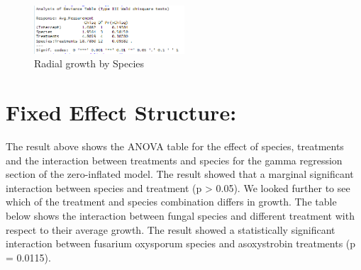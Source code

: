 \documentclass[
  10pt,
  letterpaper,
  twocolumn]{article}
\begin{document}
\begin{figure}

{\centering \includegraphics[width=0.5\textwidth,height=\textheight]{Fig11.png}

}

\caption{Radial growth by Species}

\end{figure}

\hypertarget{fixed-effect-structure}{%
\section{Fixed Effect Structure:}\label{fixed-effect-structure}}

The result above shows the ANOVA table for the effect of species,
treatments and the interaction between treatments and species for the
gamma regression section of the zero-inflated model. The result showed
that a marginal significant interaction between species and treatment (p
\textgreater{} 0.05). We looked further to see which of the treatment
and species combination differs in growth. The table below shows the
interaction between fungal species and different treatment with respect
to their average growth. The result showed a statistically significant
interaction between fusarium oxysporum species and asoxystrobin
treatments (p = 0.0115).
\end{document}

